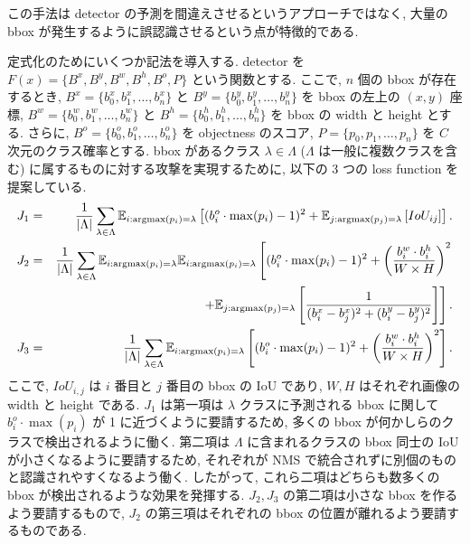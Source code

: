 この手法は detector の予測を間違えさせるというアプローチではなく, 大量の bbox が発生するように誤認識させるという点が特徴的である.

定式化のためにいくつか記法を導入する.
detector を $F(x) = \{ B^x, B^y, B^w, B^h, B^o, P \}$ という関数とする.
ここで, $n$ 個の bbox が存在するとき, $B^x = \{b^x_0, b^x_1, \dots, b^x_n\}$ と $B^y = \{b^y_0, b^y_1, \dots, b^y_n\}$ を bbox の左上の $(x,y)$ 座標, $B^w = \{b^w_0, b^w_1, \dots, b^w_n\}$ と $B^h = \{b^h_0, b^h_1, \dots, b^h_n\}$ を bbox の width と height とする.
さらに, $B^o = \{b^o_0, b^o_1, \dots, b^o_n\}$ を objectness のスコア, $P = \{p_0, p_1, \dots, p_n\}$ を $C$ 次元のクラス確率とする.
bbox があるクラス $\lambda \in \Lambda$ ($\Lambda$ は一般に複数クラスを含む) に属するものに対する攻撃を実現するために, 以下の 3 つの loss function を提案している.
%
\begin{eqnarray}
J_1 &=& \frac{1}{|\Lambda|} \sum_{\lambda \in \Lambda} \mathbb{E}_{i:\mathop{\rm argmax}\limits(p_i) = \lambda} \left[ (b^o_i \cdot \max (p_i)  - 1)^2 + \mathbb{E}_{j:\mathop{\rm argmax}\limits(p_j) = \lambda} \left[ IoU_{ij} \right] \right]. \\
J_2 &=& \frac{1}{|\Lambda|} \sum_{\lambda \in \Lambda} \mathbb{E}_{i:\mathop{\rm argmax}\limits(p_i) = \lambda} \mathbb{E}_{i:\mathop{\rm argmax}\limits(p_i) = \lambda} \left[ (b^o_i \cdot \max (p_i)  - 1)^2 + \left( \frac{b^w_i \cdot b^h_i}{W \times H} \right)^2 \right. \nonumber \\
&& \left. + \mathbb{E}_{j:\mathop{\rm argmax}\limits(p_j) = \lambda} \left[ \frac{1}{(b^x_i - b^x_j)^2 + (b^y_i - b^y_j)^2} \right] \right]. \\
J_3 &=& \frac{1}{|\Lambda|} \sum_{\lambda \in \Lambda} \mathbb{E}_{i:\mathop{\rm argmax}\limits(p_i) = \lambda} \left[ (b^o_i \cdot \max (p_i)  - 1)^2 + \left( \frac{b^w_i \cdot b^h_i}{W \times H} \right)^2 \right].
\label{eq:daedalus-loss}
\end{eqnarray}
%
ここで, $IoU_{i,j}$ は $i$ 番目と $j$ 番目の bbox の IoU であり, $W, H$ はそれぞれ画像の width と height である.
$J_1$ は第一項は $\lambda$ クラスに予測される bbox に関して $b^o_i \cdot \max (p_i)$ が 1 に近づくように要請するため, 多くの bbox が何かしらのクラスで検出されるように働く.
第二項は $\Lambda$ に含まれるクラスの bbox 同士の IoU が小さくなるように要請するため, それぞれが NMS で統合されずに別個のものと認識されやすくなるよう働く.
したがって, これら二項はどちらも数多くの bbox が検出されるような効果を発揮する.
$J_2, J_3$ の第二項は小さな bbox を作るよう要請するもので, $J_2$ の第三項はそれぞれの bbox の位置が離れるよう要請するものである.

